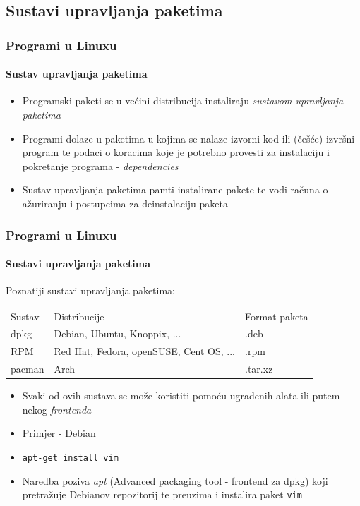 \documentclass[table,usenames,dvipsnames]{beamer}
\newcommand{\shell}[1]{\texttt{#1}}
\begin{document}
\subsection{Sustavi upravljanja paketima}
\begin{frame}[t]
	\frametitle{Programi u Linuxu}
	\framesubtitle{Sustav upravljanja paketima}
	\begin{itemize}
		\item Programski paketi se u većini distribucija instaliraju \emph{sustavom upravljanja paketima}
		\item Programi dolaze u paketima u kojima se nalaze izvorni kod ili (češće) izvršni program te podaci o koracima koje je potrebno provesti za instalaciju i pokretanje programa - \emph{dependencies}
		\item Sustav upravljanja paketima pamti instalirane pakete te vodi računa o ažuriranju i postupcima za deinstalaciju paketa
	\end{itemize}
\end{frame}

\begin{frame}[t]
	\frametitle{Programi u Linuxu}
	\framesubtitle{Sustavi upravljanja paketima}
	Poznatiji sustavi upravljanja paketima:
	\begin{table}[h]
		\begin{tabular}{l l l}
			\rowcolor{BlueViolet!20} Sustav & Distribucije & Format paketa \\
			dpkg & Debian, Ubuntu, Knoppix, ... & .deb \\
			RPM & Red Hat, Fedora, openSUSE, Cent OS, ... & .rpm \\
			pacman & Arch & .tar.xz \\
		\end{tabular}
	\end{table}
	\begin{itemize}
		\item Svaki od ovih sustava se može koristiti pomoću ugrađenih alata ili putem nekog \emph{frontenda}
		\item Primjer - Debian
		\item[] \shell{apt-get install vim}
		\item[] \small Naredba poziva \emph{apt} (Advanced packaging tool - frontend za dpkg) koji pretražuje Debianov repozitorij te preuzima i instalira paket \shell{vim}
	\end{itemize}
\end{frame}
\end{document}
